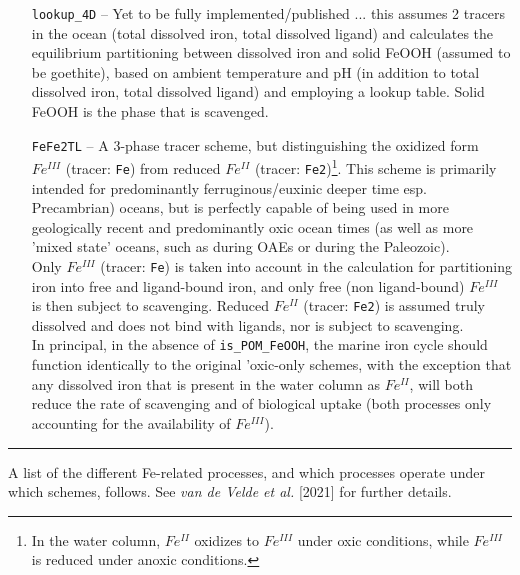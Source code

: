 \begin{itemize}[noitemsep]
\vspace{1mm}
\item [\texttt{lookup\_4D}] -- Yet to be fully implemented/published ... this assumes 2 tracers in the ocean (total dissolved iron, total dissolved ligand) and calculates the equilibrium partitioning between dissolved iron and solid FeOOH (assumed to be goethite), based on ambient temperature and pH (in addition to total dissolved iron, total dissolved ligand) and employing a lookup table. Solid FeOOH is the phase that is scavenged.
\vspace{1mm}
\item [\texttt{FeFe2TL}] -- A 3-phase tracer scheme, but distinguishing the oxidized form \(Fe^{III}\) (tracer: \texttt{Fe}) from reduced \(Fe^{II}\) (tracer: \texttt{Fe2})\footnote{In the water column, \(Fe^{II}\) oxidizes to \(Fe^{III}\) under oxic conditions, while \(Fe^{III}\) is reduced under anoxic conditions.}. This scheme is primarily intended for predominantly ferruginous/euxinic deeper time esp. Precambrian) oceans, but is perfectly capable of being used in more geologically recent and predominantly oxic ocean times (as well as more 'mixed state' oceans, such as during OAEs or during the Paleozoic).
\\Only \(Fe^{III}\) (tracer: \texttt{Fe}) is taken into account in the calculation for  partitioning iron into free and ligand-bound iron, and only free (non ligand-bound) \(Fe^{III}\) is then subject to scavenging. Reduced \(Fe^{II}\) (tracer: \texttt{Fe2}) is assumed truly dissolved and does not bind with ligands, nor is subject to scavenging.
\\In principal, in the absence of \texttt{is\_POM\_FeOOH}, the marine iron cycle should function identically to the original 'oxic-only schemes, with the exception that any dissolved iron that is present in the water column as \(Fe^{II}\), will both reduce the rate of scavenging and of biological uptake (both processes only accounting for the availability of \(Fe^{III}\)). 
\end{itemize}

\vspace{1mm}
\noindent\rule{4cm}{0.5pt}
\vspace{2mm}

\noindent A list of the different Fe-related processes, and which processes operate under which schemes, follows. See \textit{van de Velde et al.} [2021] for further details.
\vspace{1mm}

